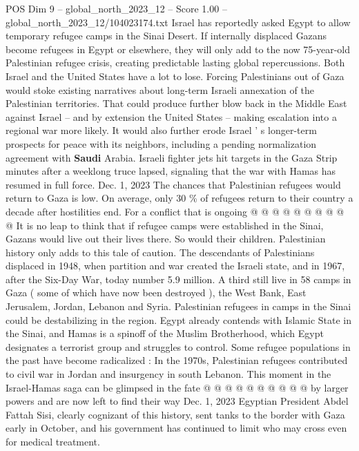 \begin{textsample}{POS Dim 9 – global\_north\_2023\_12 – Score 1.00 – global\_north\_2023\_12/104023174.txt}  \label{ex:f9_pos_374}
Israel has reportedly asked Egypt to allow temporary refugee camps in the Sinai Desert.
If internally displaced Gazans become refugees in Egypt or elsewhere, they will only add to the now 75-year-old Palestinian refugee crisis, creating predictable lasting global repercussions.
Both Israel and the United States have a lot to lose.
Forcing Palestinians out of Gaza would stoke existing narratives about long-term Israeli annexation of the Palestinian territories.
That could produce further blow back in the Middle East against Israel -- and by extension the United States -- making escalation into a regional war more likely.
It would also further erode Israel ' s longer-term prospects for peace with its neighbors, including a pending normalization agreement with \textbf{Saudi} Arabia.
Israeli fighter jets hit targets in the Gaza Strip minutes after a weeklong truce lapsed, signaling that the war with Hamas has resumed in full force.
Dec. 1, 2023 The chances that Palestinian refugees would return to Gaza is low.
On average, only 30 \% of refugees return to their country a decade after hostilities end.
For a conflict that is ongoing @ @ @ @ @ @ @ @ @ @ It is no leap to think that if refugee camps were established in the Sinai, Gazans would live out their lives there.
So would their children.
Palestinian history only adds to this tale of caution.
The descendants of Palestinians displaced in 1948, when partition and war created the Israeli state, and in 1967, after the Six-Day War, today number 5.9 million.
A third still live in 58 camps in Gaza ( some of which have now been destroyed ), the West Bank, East Jerusalem, Jordan, Lebanon and Syria.
Palestinian refugees in camps in the Sinai could be destabilizing in the region.
Egypt already contends with Islamic State in the Sinai, and Hamas is a spinoff of the Muslim Brotherhood, which Egypt designates a terrorist group and struggles to control.
Some refugee populations in the past have become radicalized : In the 1970s, Palestinian refugees contributed to civil war in Jordan and insurgency in south Lebanon.
This moment in the Israel-Hamas saga can be glimpsed in the fate @ @ @ @ @ @ @ @ @ @ by larger powers and are now left to find their way Dec. 1, 2023 Egyptian President Abdel Fattah Sisi, clearly cognizant of this history, sent tanks to the border with Gaza early in October, and his government has continued to limit who may cross even for medical treatment.

\end{textsample}
